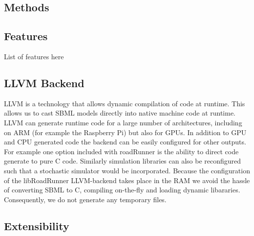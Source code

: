 \documentclass{bioinfo}
\begin{document}
\begin{methods}
\section{Methods}

\subsection{Features}

List of features here

\subsection{LLVM Backend}

LLVM is a technology that allows dynamic compilation of code at runtime. This allows us to cast SBML models directly into native machine code at runtime. LLVM can generate runtime code for a large number of architectures, including on ARM (for example the  Raspberry Pi) but also for GPUs. In addition to GPU and CPU generated code the backend can be easily configured for other outputs. For example one option included with roadRunner is the ability to direct code generate to pure C code. Similarly simulation libraries can also be reconfigured such that a stochastic simulator would be incorporated. Because the configuration of the libRoadRunner LLVM-backend takes place in the RAM we avoid  the hassle of converting SBML to C, compiling on-the-fly and loading dynamic libararies. Consequently, we do not generate any temporary files. 

\subsection{Extensibility}


\end{methods}
\end{document}
